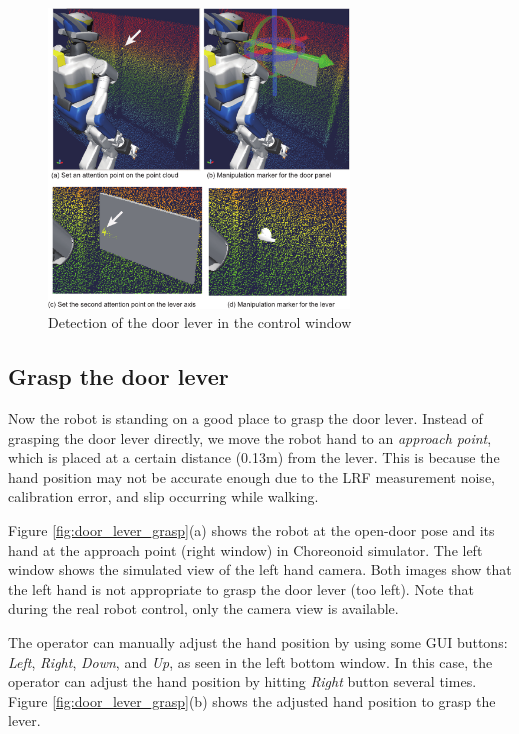 \begin{figure}[t]
  \centering
  \includegraphics[width = 8cm]{img/door_manipulation_markers}
  \caption{Detection of the door lever in the control window}
  \label{fig:door_manip_markers}
\end{figure}

\subsection{Grasp the door lever}
%
Now the robot is standing on a good place to grasp the door lever.
Instead of grasping the door lever directly, we move the robot hand to an {\it approach point},
which is placed at a certain distance (0.13m) from the lever. 
This is because the hand position may not be accurate enough due to the LRF measurement noise,
calibration error, and slip occurring while walking.

Figure \ref{fig:door_lever_grasp}(a) shows the robot at the open-door pose and its hand at the
approach point (right window) in Choreonoid simulator.
The left window shows the simulated view of the left hand camera.
Both images show that the left hand is not appropriate to grasp the door lever (too left).
Note that during the real robot control, only the camera view is available. 

The operator can manually adjust the hand position by using some GUI buttons: 
{\it Left}, {\it Right}, {\it Down}, and {\it Up}, as seen in the left bottom window.
In this case, the operator can adjust the hand position by hitting {\it Right} button
several times.
Figure \ref{fig:door_lever_grasp}(b) shows the adjusted hand position to grasp the lever.

